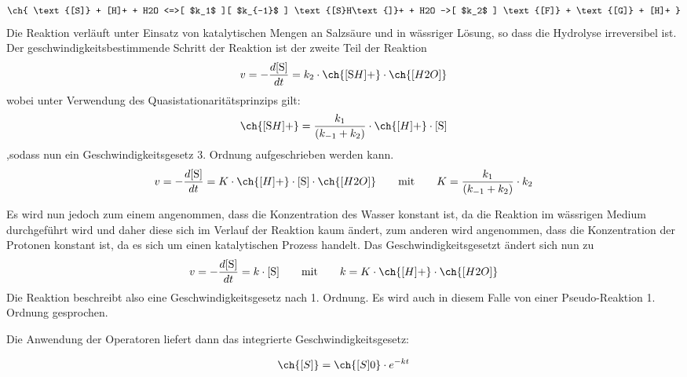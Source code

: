 \begin{equation}
\ch{ \text{[S]} + [H]+ + H2O <=>[ $k_1$ ][ $k_{-1}$ ] \text{[S}H\text{]}+ + H2O ->[ $k_2$ ] \text{[F]} + \text{[G]} + [H]+  }
\label{Hydrolysegleichung}
\end{equation}
Die Reaktion verläuft unter Einsatz von katalytischen Mengen an Salzsäure und in wässriger Lösung, so dass die Hydrolyse irreversibel ist. Der geschwindigkeitsbestimmende Schritt der Reaktion ist der zweite Teil der Reaktion
\begin{align}
v = - \frac{d \text{[S]}}{dt}= k_2 \cdot \ch{\text{[S}H\text{]}+} \cdot \ch{[H2O]}
\label{eq:irreversibler2.Schritt}
\end{align}
wobei unter Verwendung des Quasistationaritätsprinzips gilt:
\begin{align}
\ch{\text{[S}H\text{]}+}=\frac{k_1}{\left(k_{-1} + k_2\right)}
 \cdot \ch{\text{[}H\text{]}+} \cdot \text{[S]}
 \label{eq:quasistationfürSH+}
\end{align}
,sodass nun ein Geschwindigkeitsgesetz 3. Ordnung aufgeschrieben werden kann.
\begin{align}
v = - \frac{d \text{[S]}}{dt}= K \cdot \ch{\text{[}H\text{]}+} \cdot \text{[S]} \cdot \ch{[H2O]}
\quad\quad \text{mit}\quad\quad  K=\frac{k_1}{\left(k_{-1} + k_2\right)}
 \cdot k_2
 \label{eq:Gesetz3.Ordnung}
\end{align}

Es wird nun jedoch zum einem angenommen, dass die Konzentration des Wasser konstant ist, da die Reaktion im wässrigen Medium durchgeführt wird und daher diese sich im Verlauf der Reaktion kaum ändert, zum anderen wird angenommen, dass die Konzentration der Protonen konstant ist, da es sich um einen katalytischen Prozess handelt. Das Geschwindigkeitsgesetzt ändert sich nun zu
\begin{equation}
v = - \frac{d \text{[S]}}{dt}= k \cdot \text{[S]}
\quad\quad \text{mit}\quad\quad  k=K\cdot\ch{\text{[}H\text{]}+} \cdot \ch{[H2O]}
\label{Pseudo1.Ordnung}
\end{equation}
Die Reaktion beschreibt also eine Geschwindigkeitsgesetz nach  1. Ordnung. Es wird auch in diesem Falle von einer Pseudo-Reaktion 1. Ordnung gesprochen. 



Die Anwendung der Operatoren liefert dann das integrierte Geschwindigkeitsgesetz:

\begin{equation}
\ch{[S]} = \ch{[S]0}\cdot e^{-kt}
\label{eq:integriertesGesetz}
\end{equation}

